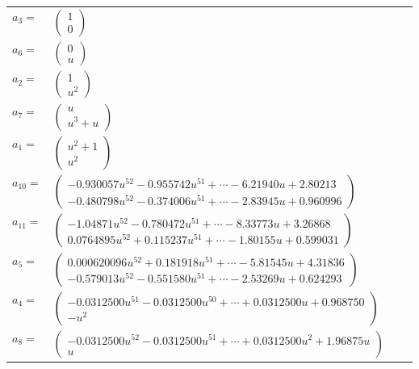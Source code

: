 \documentclass[1p]{elsarticle_modified}
\theoremstyle{definition}
\begin{document}
\begin{tabular}{m{7pt} m{180pt} m{7pt} m{180pt} }
\flushright $a_{3}=$&$\begin{pmatrix}1\\0\end{pmatrix}$ \\
\flushright $a_{6}=$&$\begin{pmatrix}0\\u\end{pmatrix}$ \\
\flushright $a_{2}=$&$\begin{pmatrix}1\\u^2\end{pmatrix}$ \\
\flushright $a_{7}=$&$\begin{pmatrix}u\\u^3+u\end{pmatrix}$ \\
\flushright $a_{1}=$&$\begin{pmatrix}u^2+1\\u^2\end{pmatrix}$ \\
\flushright $a_{10}=$&$\begin{pmatrix}-0.930057 u^{52}-0.955742 u^{51}+\cdots-6.21940 u+2.80213\\-0.480798 u^{52}-0.374006 u^{51}+\cdots-2.83945 u+0.960996\end{pmatrix}$ \\
\flushright $a_{11}=$&$\begin{pmatrix}-1.04871 u^{52}-0.780472 u^{51}+\cdots-8.33773 u+3.26868\\0.0764895 u^{52}+0.115237 u^{51}+\cdots-1.80155 u+0.599031\end{pmatrix}$ \\
\flushright $a_{5}=$&$\begin{pmatrix}0.000620096 u^{52}+0.181918 u^{51}+\cdots-5.81545 u+4.31836\\-0.579013 u^{52}-0.551580 u^{51}+\cdots-2.53269 u+0.624293\end{pmatrix}$ \\
\flushright $a_{4}=$&$\begin{pmatrix}-0.0312500 u^{51}-0.0312500 u^{50}+\cdots+0.0312500 u+0.968750\\- u^2\end{pmatrix}$ \\
\flushright $a_{8}=$&$\begin{pmatrix}-0.0312500 u^{52}-0.0312500 u^{51}+\cdots+0.0312500 u^{2}+1.96875 u\\u\end{pmatrix}$ \\

\end{tabular}
\end{document}
